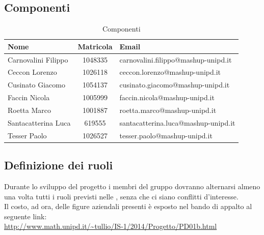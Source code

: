 	\pagebreak
	
	\subsection{Componenti} %
	\label{sub:componenti}
		\begin{table}[!h]
			\begin{center}
				\begin{tabularx}{0.95\textwidth}{|l|c|X|}
					\hline
					\textbf{Nome} & \textbf{Matricola} & \textbf{Email} \\
					\hline
					Carnovalini Filippo &
					1048335 &
					carnovalini.filippo@mashup-unipd.it  \\
					\hline
			
					Ceccon Lorenzo &
					1026118 &
					ceccon.lorenzo@mashup-unipd.it \\
					\hline
			
					Cusinato Giacomo &
					1054137 &
					cusinato.giacomo@mashup-unipd.it \\
					\hline
			
					Faccin Nicola &
					1005999 &
					faccin.nicola@mashup-unipd.it \\
					\hline
			
					Roetta Marco &
					1001887 &
					roetta.marco@mashup-unipd.it \\
					\hline
			
					Santacatterina Luca &
				 	619555 &
					santacatterina.luca@mashup-unipd.it \\
					\hline
			
					Tesser Paolo &
					1026527 &
					tesser.paolo@mashup-unipd.it \\
					\hline					
				\end{tabularx}	
			\end{center}
		\caption{Componenti}
		\end{table}

	\subsection{Definizione dei ruoli} %
	\label{sub:definizione_dei_ruoli}
	Durante lo sviluppo del progetto i membri del gruppo dovranno alternarsi almeno una volta tutti i ruoli previsti nelle \docNameVersionNdP{}, senza che ci siano conflitti d'interesse. \\
	Il costo, ad ora, delle figure aziendali presenti è esposto nel bando di appalto al seguente link: \\
	\url{http://www.math.unipd.it/~tullio/IS-1/2014/Progetto/PD01b.html}

